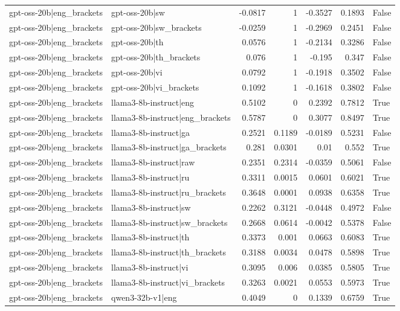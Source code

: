 \begin{table}
\begin{tabular}{l l r r r r l}
gpt-oss-20b|eng_brackets & gpt-oss-20b|sw & -0.0817 & 1 & -0.3527 & 0.1893 & False \\
gpt-oss-20b|eng_brackets & gpt-oss-20b|sw_brackets & -0.0259 & 1 & -0.2969 & 0.2451 & False \\
gpt-oss-20b|eng_brackets & gpt-oss-20b|th & 0.0576 & 1 & -0.2134 & 0.3286 & False \\
gpt-oss-20b|eng_brackets & gpt-oss-20b|th_brackets & 0.076 & 1 & -0.195 & 0.347 & False \\
gpt-oss-20b|eng_brackets & gpt-oss-20b|vi & 0.0792 & 1 & -0.1918 & 0.3502 & False \\
gpt-oss-20b|eng_brackets & gpt-oss-20b|vi_brackets & 0.1092 & 1 & -0.1618 & 0.3802 & False \\
gpt-oss-20b|eng_brackets & llama3-8b-instruct|eng & 0.5102 & 0 & 0.2392 & 0.7812 & True \\
gpt-oss-20b|eng_brackets & llama3-8b-instruct|eng_brackets & 0.5787 & 0 & 0.3077 & 0.8497 & True \\
gpt-oss-20b|eng_brackets & llama3-8b-instruct|ga & 0.2521 & 0.1189 & -0.0189 & 0.5231 & False \\
gpt-oss-20b|eng_brackets & llama3-8b-instruct|ga_brackets & 0.281 & 0.0301 & 0.01 & 0.552 & True \\
gpt-oss-20b|eng_brackets & llama3-8b-instruct|raw & 0.2351 & 0.2314 & -0.0359 & 0.5061 & False \\
gpt-oss-20b|eng_brackets & llama3-8b-instruct|ru & 0.3311 & 0.0015 & 0.0601 & 0.6021 & True \\
gpt-oss-20b|eng_brackets & llama3-8b-instruct|ru_brackets & 0.3648 & 0.0001 & 0.0938 & 0.6358 & True \\
gpt-oss-20b|eng_brackets & llama3-8b-instruct|sw & 0.2262 & 0.3121 & -0.0448 & 0.4972 & False \\
gpt-oss-20b|eng_brackets & llama3-8b-instruct|sw_brackets & 0.2668 & 0.0614 & -0.0042 & 0.5378 & False \\
gpt-oss-20b|eng_brackets & llama3-8b-instruct|th & 0.3373 & 0.001 & 0.0663 & 0.6083 & True \\
gpt-oss-20b|eng_brackets & llama3-8b-instruct|th_brackets & 0.3188 & 0.0034 & 0.0478 & 0.5898 & True \\
gpt-oss-20b|eng_brackets & llama3-8b-instruct|vi & 0.3095 & 0.006 & 0.0385 & 0.5805 & True \\
gpt-oss-20b|eng_brackets & llama3-8b-instruct|vi_brackets & 0.3263 & 0.0021 & 0.0553 & 0.5973 & True \\
gpt-oss-20b|eng_brackets & qwen3-32b-v1|eng & 0.4049 & 0 & 0.1339 & 0.6759 & True \\

\end{tabular}
\end{table}
